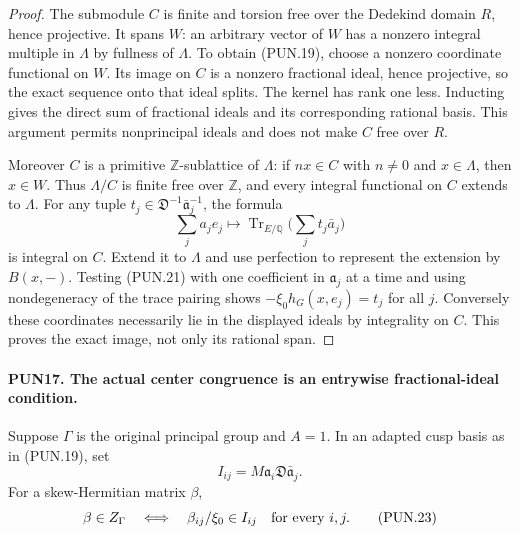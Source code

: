 \documentclass[11pt,a4paper]{article}
\numberwithin{equation}{section}
\theoremstyle{remark}\newtheorem{remark}[theorem]{Remark}
\begin{document}
\begin{proof}
The submodule \(C\) is finite and torsion free over the Dedekind
domain \(R\), hence projective.  It spans \(W\): an arbitrary
vector of \(W\) has a nonzero integral multiple in \(\Lambda\)
by fullness of \(\Lambda\).  To obtain (PUN.19), choose a
nonzero coordinate functional on \(W\).  Its image on \(C\)
is a nonzero fractional ideal, hence projective, so the exact
sequence onto that ideal splits.  The kernel has rank one less.
Inducting gives the direct sum of fractional ideals and its
corresponding rational basis.  This argument permits nonprincipal
ideals and does not make \(C\) free over \(R\).

Moreover \(C\) is a primitive \(\mathbb Z\)-sublattice of
\(\Lambda\): if \(n x\in C\) with \(n\ne0\) and
\(x\in\Lambda\), then \(x\in W\).  Thus
\(\Lambda/C\) is finite free over \(\mathbb Z\), and every
integral functional on \(C\) extends to \(\Lambda\).
For any tuple \(t_j\in\mathfrak D^{-1}\bar{\mathfrak a}_j^{-1}\),
the formula
\[
          \sum_j a_j e_j\longmapsto
                  \operatorname{Tr}_{E/\mathbb Q}
                                      \bigl(\sum_j t_j\bar a_j\bigr)
 \tag{PUN.21}
\]
is integral on \(C\).  Extend it to \(\Lambda\) and use
perfection to represent the extension by \(B(x,-)\).
Testing (PUN.21) with one coefficient in \(\mathfrak a_j\)
at a time and using nondegeneracy of the trace pairing shows
\(-\xi_0h_G(x,e_j)=t_j\) for all \(j\).
Conversely these coordinates necessarily lie in the displayed
ideals by integrality on \(C\).  This proves the exact image,
not only its rational span.
\end{proof}

\paragraph{PUN17. The actual center congruence is an entrywise fractional-ideal condition.}
\label{claim:PUN17}
Suppose \(\Gamma\) is the original principal group and \(A=1\).
In an adapted cusp basis as in (PUN.19), set
\[
            I_{ij}=M\mathfrak a_i\mathfrak D\bar{\mathfrak a}_j.
 \tag{PUN.22}
\]
For a skew-Hermitian matrix \(\beta\),
\[
 \beta\in Z_\Gamma
       \quad\Longleftrightarrow\quad
           \beta_{ij}/\xi_0\in I_{ij}\quad\hbox{for every }i,j.
 \tag{PUN.23}
\]
\end{document}
